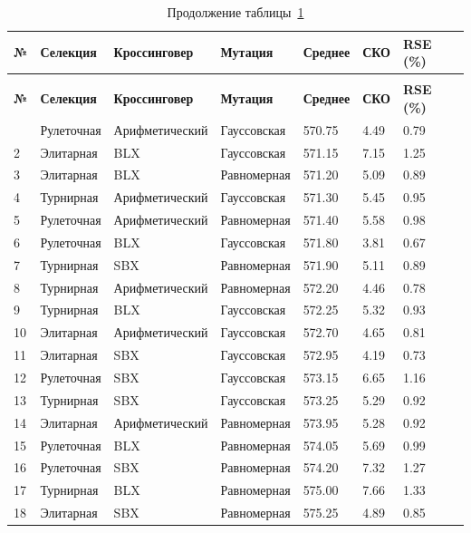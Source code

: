 \begin{longtable}{|p{}|p{}|p{}|p{}|p{}|p{}|p{}|}
	\caption{Результаты для задачи eil76.tsp. Оптимальное решение 538.00}\label{tbl:eil76.tsp} \\
	\hline
	\textbf{№} & \textbf{Селекция} & \textbf{Кроссинговер} & \textbf{Мутация} & \textbf{Среднее} & \textbf{СКО} & \textbf{RSE (\%)} \\
	\hline
	\endfirsthead
	\caption*{Продолжение таблицы~\ref{tbl:eil76.tsp}} \\
	\hline
	\textbf{№} & \textbf{Селекция} & \textbf{Кроссинговер} & \textbf{Мутация} & \textbf{Среднее} & \textbf{СКО} & \textbf{RSE (\%)} \\
	\hline
	\endhead
	\hline
	\endfoot
	\endlastfoot
	1 & Рулеточная & Арифметический & Гауссовская & 570.75 & 4.49 & 0.79 \\
	\hline
	2 & Элитарная & BLX & Гауссовская & 571.15 & 7.15 & 1.25 \\
	\hline
	3 & Элитарная & BLX & Равномерная & 571.20 & 5.09 & 0.89 \\
	\hline
	4 & Турнирная & Арифметический & Гауссовская & 571.30 & 5.45 & 0.95 \\
	\hline
	5 & Рулеточная & Арифметический & Равномерная & 571.40 & 5.58 & 0.98 \\
	\hline
	6 & Рулеточная & BLX & Гауссовская & 571.80 & 3.81 & 0.67 \\
	\hline
	7 & Турнирная & SBX & Равномерная & 571.90 & 5.11 & 0.89 \\
	\hline
	8 & Турнирная & Арифметический & Равномерная & 572.20 & 4.46 & 0.78 \\
	\hline
	9 & Турнирная & BLX & Гауссовская & 572.25 & 5.32 & 0.93 \\
	\hline
	10 & Элитарная & Арифметический & Гауссовская & 572.70 & 4.65 & 0.81 \\
	\hline
	11 & Элитарная & SBX & Гауссовская & 572.95 & 4.19 & 0.73 \\
	\hline
	12 & Рулеточная & SBX & Гауссовская & 573.15 & 6.65 & 1.16 \\
	\hline
	13 & Турнирная & SBX & Гауссовская & 573.25 & 5.29 & 0.92 \\
	\hline
	14 & Элитарная & Арифметический & Равномерная & 573.95 & 5.28 & 0.92 \\
	\hline
	15 & Рулеточная & BLX & Равномерная & 574.05 & 5.69 & 0.99 \\
	\hline
	16 & Рулеточная & SBX & Равномерная & 574.20 & 7.32 & 1.27 \\
	\hline
	17 & Турнирная & BLX & Равномерная & 575.00 & 7.66 & 1.33 \\
	\hline
	18 & Элитарная & SBX & Равномерная & 575.25 & 4.89 & 0.85 \\
	\hline
\end{longtable}


